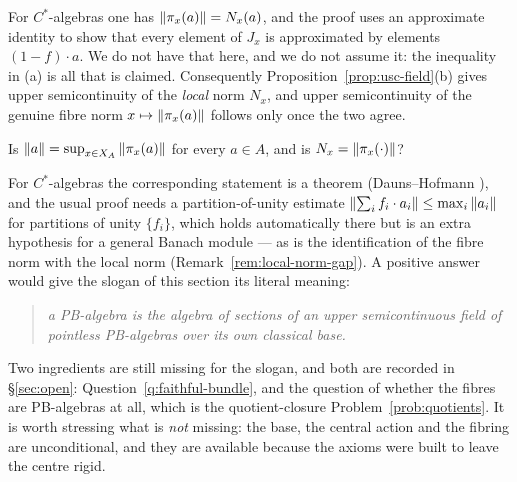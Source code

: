 \begin{remark}\label{rem:local-norm-gap}
For $C^*$-algebras one has $\left\lVert\pi_x(a)\right\rVert=N_x(a)$, and the proof uses an
approximate identity to show that every element of $J_x$ is approximated by
elements $(1-f)\cdot a$.  We do not have that here, and we do not assume it: the
inequality in (a) is all that is claimed.  Consequently
Proposition~\ref{prop:usc-field}(b) gives upper semicontinuity of the
\emph{local} norm $N_x$, and upper semicontinuity of the genuine fibre norm
$x\mapsto\left\lVert\pi_x(a)\right\rVert$ follows only once the two agree.
\end{remark}

\begin{question}\label{q:faithful-bundle}
Is $\left\lVert a\right\rVert=\sup_{x\in X_A}\left\lVert\pi_x(a)\right\rVert$ for every $a\in A$, and is
$N_x=\left\lVert\pi_x(\cdot)\right\rVert$?
\end{question}

For $C^*$-algebras the corresponding statement is a theorem
(Dauns--Hofmann \cite{DaunsHofmann}), and the usual proof needs a
partition-of-unity estimate $\left\lVert\sum_if_i\cdot a_i\right\rVert\le\max_i\left\lVert a_i\right\rVert$ for
partitions of unity $\{f_i\}$, which holds automatically there but is an extra
hypothesis for a general Banach module --- as is the identification of the
fibre norm with the local norm (Remark~\ref{rem:local-norm-gap}).  A positive answer would give the slogan of this section
its literal meaning:

\begin{quote}
\emph{a PB-algebra is the algebra of sections of an upper semicontinuous field
of pointless PB-algebras over its own classical base.}
\end{quote}

Two ingredients are still missing for the slogan, and both are recorded in
\S\ref{sec:open}: Question~\ref{q:faithful-bundle}, and the question of whether
the fibres are PB-algebras at all, which is the quotient-closure
Problem~\ref{prob:quotients}.  It is worth stressing what is \emph{not}
missing: the base, the central action and the fibring are unconditional, and
they are available because the axioms were built to leave the centre rigid.
